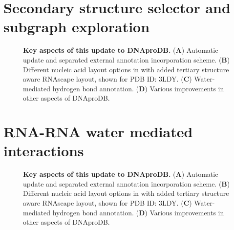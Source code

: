 \section{Secondary structure selector and subgraph exploration}

\begin{center}
    \begin{figure}
        \caption[Key aspects of this update to DNAproDB.]{\textbf{Key aspects of this update to DNAproDB.} ({\bf A}) Automatic update and separated external annotation incorporation scheme.  ({\bf B})  Different nucleic acid layout options in with added tertiary structure aware RNAscape layout, shown for PDB ID: 3LDY. ({\bf C}) Water-mediated hydrogen bond annotation. ({\bf D}) Various improvements in other aspects of DNAproDB. }
  \label{fig:rnaprodb2}
\end{figure}
\end{center}

\section{RNA-RNA water mediated interactions}

\begin{center}
    \begin{figure}
        \caption[Key aspects of this update to DNAproDB.]{\textbf{Key aspects of this update to DNAproDB.} ({\bf A}) Automatic update and separated external annotation incorporation scheme.  ({\bf B})  Different nucleic acid layout options in with added tertiary structure aware RNAscape layout, shown for PDB ID: 3LDY. ({\bf C}) Water-mediated hydrogen bond annotation. ({\bf D}) Various improvements in other aspects of DNAproDB. }
  \label{fig:rnaprodb3}
\end{figure}
\end{center}